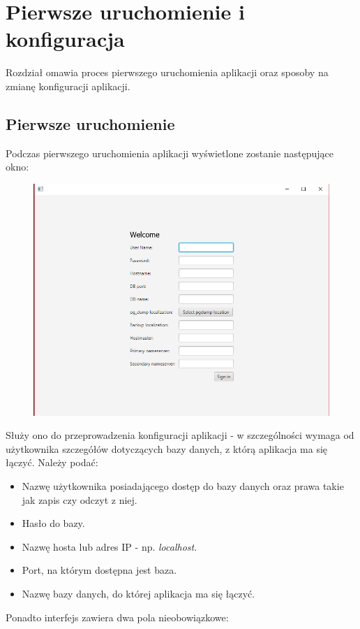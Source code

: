 \documentclass[12pt] {article}
\begin{document}
\section{Pierwsze uruchomienie i konfiguracja}
\label{first_run}
Rozdział omawia proces pierwszego uruchomienia aplikacji oraz sposoby na zmianę konfiguracji aplikacji.

\subsection{Pierwsze uruchomienie}
Podczas pierwszego uruchomienia aplikacji wyświetlone zostanie następujące okno:
\begin{figure}[H]
\centering
\includegraphics[scale=0.5]{res/2_konfiguracja}
\end{figure}
Służy ono do przeprowadzenia konfiguracji aplikacji - w szczególności wymaga od użytkownika szczegółów dotyczących bazy danych, z którą aplikacja ma się łączyć. Należy podać:
\begin{itemize}
\item Nazwę użytkownika posiadającego dostęp do bazy danych oraz prawa takie jak zapis czy odczyt z niej.
\item Hasło do bazy.
\item Nazwę hosta lub adres IP - np. \emph{localhost}.
\item Port, na którym dostępna jest baza.
\item Nazwę bazy danych, do której aplikacja ma się łączyć.
\end{itemize}
Ponadto interfejs zawiera dwa pola nieobowiązkowe:
\end{document}
